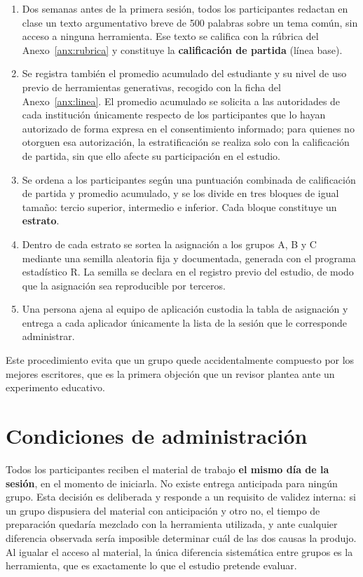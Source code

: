 \documentclass[12pt,a4paper,openany]{report}
\begin{document}
    \begin{enumerate}[label=\textbf{Paso \arabic*.},leftmargin=1.9cm]
        \item Dos semanas antes de la primera sesi\'on, todos los participantes redactan en clase un texto argumentativo breve de 500 palabras sobre un tema com\'un, sin acceso a ninguna herramienta. Ese texto se califica con la r\'ubrica del Anexo~\ref{anx:rubrica} y constituye la \textbf{calificaci\'on de partida} (l\'inea base).
        \item Se registra tambi\'en el promedio acumulado del estudiante y su nivel de uso previo de herramientas generativas, recogido con la ficha del Anexo~\ref{anx:linea}. El promedio acumulado se solicita a las autoridades de cada instituci\'on \'unicamente respecto de los participantes que lo hayan autorizado de forma expresa en el consentimiento informado; para quienes no otorguen esa autorizaci\'on, la estratificaci\'on se realiza solo con la calificaci\'on de partida, sin que ello afecte su participaci\'on en el estudio.
        \item Se ordena a los participantes seg\'un una puntuaci\'on combinada de calificaci\'on de partida y promedio acumulado, y se los divide en tres bloques de igual tama\~no: tercio superior, intermedio e inferior. Cada bloque constituye un \textbf{estrato}.
        \item Dentro de cada estrato se sortea la asignaci\'on a los grupos A, B y C mediante una semilla aleatoria fija y documentada, generada con el programa estad\'istico R. La semilla se declara en el registro previo del estudio, de modo que la asignaci\'on sea reproducible por terceros.
        \item Una persona ajena al equipo de aplicaci\'on custodia la tabla de asignaci\'on y entrega a cada aplicador \'unicamente la lista de la sesi\'on que le corresponde administrar.
    \end{enumerate}
    
    Este procedimiento evita que un grupo quede accidentalmente compuesto por los mejores escritores, que es la primera objeci\'on que un revisor plantea ante un experimento educativo.
    
    \section{Condiciones de administraci\'on}
    
    Todos los participantes reciben el material de trabajo \textbf{el mismo d\'ia de la sesi\'on}, en el momento de iniciarla. No existe entrega anticipada para ning\'un grupo. Esta decisi\'on es deliberada y responde a un requisito de validez interna: si un grupo dispusiera del material con anticipaci\'on y otro no, el tiempo de preparaci\'on quedar\'ia mezclado con la herramienta utilizada, y ante cualquier diferencia observada ser\'ia imposible determinar cu\'al de las dos causas la produjo. Al igualar el acceso al material, la \'unica diferencia sistem\'atica entre grupos es la herramienta, que es exactamente lo que el estudio pretende evaluar.
    
\end{document}
